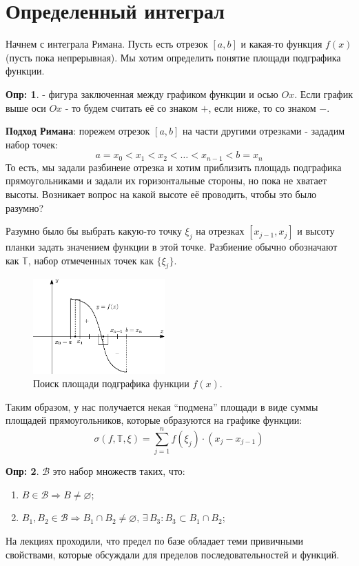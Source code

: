\documentclass[12pt]{article}
\newcommand{\RN}[1]{%
	\textup{\uppercase\expandafter{\romannumeral#1}}%
}
\newcommand{\MTB}{\mathbb{T}}
\newcommand{\MB}{\mathcal{B}}
\newcommand{\VN}{\varnothing}
\theoremstyle{definition}
\newtheorem{defn}{Опр:}
\newcommand{\ddsum}[2]{\displaystyle\sum\limits_{#1}^{#2}}
\begin{document}
\lhead{Математический анализ - \RN{2}}

\section*{Определенный интеграл}
Начнем с интеграла Римана. Пусть есть отрезок $[a,b]$ и какая-то функция $f(x)$ (пусть пока непрерывная). Мы хотим определить понятие площади подграфика функции.
\begin{defn}
	 - фигура заключенная между графиком функции и осью $Ox$. Если график выше оси $Ox$ - то будем считать её со знаком $+$, если ниже, то со знаком $-$.
\end{defn}
\textbf{Подход Римана}: порежем отрезок $[a,b]$ на части другими отрезками - зададим набор точек:
$$
	a = x_0 < x_1 < x_2 < \dotsc < x_{n-1} < b = x_n
$$
То есть, мы задали разбинеие отрезка и хотим приблизить площадь подграфика прямоугольниками и задали их горизонтальные стороны, но пока не хватает высоты. Возникает вопрос на какой высоте её проводить, чтобы это было разумно? 

Разумно было бы выбрать какую-то точку $\xi_j$ на отрезках $[x_{j-1},x_j]$ и высоту планки задать значением функции в этой точке. Разбиение обычно обозначают как $\MTB$, набор отмеченных точек как $\{\xi_j\}$.

\begin{figure}[H]
	\centering
	\includegraphics[width=0.45\textwidth]{MA2S8_1.eps}
	\caption{Поиск площади подграфика функции $f(x)$.}
	\label{8_1}
\end{figure}

Таким образом, у нас получается некая ``подмена'' площади в виде суммы площадей прямоугольников, которые образуются на графике функции:
$$
	\sigma(f,\MTB,\xi) = \ddsum{j = 1}{n}f(\xi_j){\cdot}(x_j - x_{j-1})
$$
\begin{defn}
	 $\MB$ это набор множеств таких, что:
	\begin{enumerate}[label=\arabic*)]
		\item $B \in \MB \Rightarrow B \neq \VN$;
		\item $B_1,B_2 \in \MB \Rightarrow B_1 \cap B_2 \neq \VN, \, \exists \, B_3 \colon B_3 \subset B_1 \cap B_2$;
	\end{enumerate}
\end{defn}
На лекциях проходили, что предел по базе обладает теми привичными свойствами, которые обсуждали для пределов последовательностей и функций.
\end{document}
